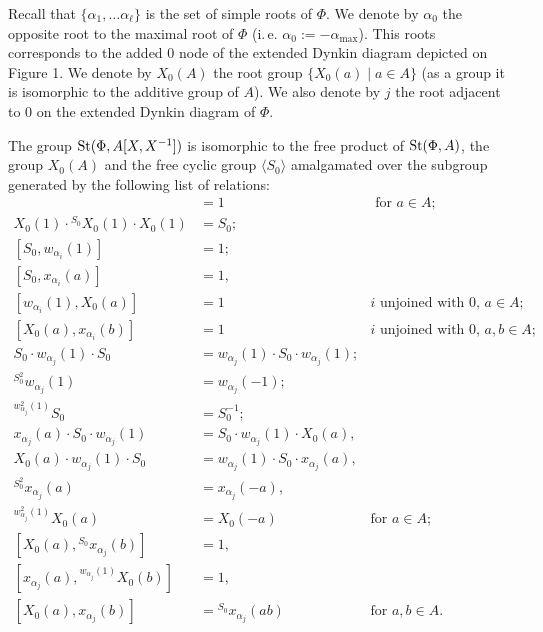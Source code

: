 Recall that $\{ \alpha_1, \ldots \alpha_\ell \}$ is the set of simple roots of $\Phi$.
We denote by $\alpha_0$ the opposite root to the maximal root of $\Phi$ (i.\,e. $\alpha_0 := -\alpha_\mathrm{max}$).
This roots corresponds to the added $0$ node of the extended Dynkin diagram depicted on Figure 1.
We denote by $X_0(A)$ the root group $\{ X_0(a) \mid a \in A\}$ (as a group it is isomorphic to the additive group of $A$).
We also denote by $j$ the root adjacent to $0$ on the extended Dynkin diagram of $\Phi$.
\begin{prop} \label{prop:Allcock-affine} The group $\operatorname{St}(\Phi, A[X, X^{-1}])$ is isomorphic to the free product of $\operatorname{St}(\Phi, A)$, the group $X_0(A)$ and the free cyclic group $\langle S_0 \rangle$
     amalgamated over the subgroup generated by the following list of relations:
    {\allowdisplaybreaks\begin{align}
        [S_0^2, X_0(a)] & = 1 & \text{ for $a \in A$; } \label{eq:Allcock-2} \\
        X_0(1) \cdot {}^{S_0} X_0(1) \cdot X_0(1) & = S_0; \label{eq:Allcock-3} \\
        [S_0, w_{\alpha_i}(1)] & = 1; &  \label{eq:Allcock-4} \\
        [S_0, x_{\alpha_i}(a)] & = 1, &  \label{eq:Allcock-5-1}\\
        [w_{\alpha_i}(1), X_0(a)] & = 1 & \text{$i$ unjoined with $0$, $a \in A;$} \label{eq:Allcock-5-2} \\
        [X_0(a), x_{\alpha_i}(b)] & = 1 & \text{$i$ unjoined with $0$, $a, b \in A;$} \label{eq:Allcock-6} \\
        S_0 \cdot w_{\alpha_j}(1) \cdot S_0 & = w_{\alpha_j}(1) \cdot S_0 \cdot w_{\alpha_j}(1); \label{eq:Allcock-7} \\
        {}^{S_0^2} w_{\alpha_j}(1) & = w_{\alpha_j}(-1); \label{eq:Allcock-8-1} \\
        {}^{w_{\alpha_j}^2(1)} S_0 & = S_0^{-1}; \label{eq:Allcock-8-2} \\
        x_{\alpha_j}(a) \cdot S_0 \cdot w_{\alpha_j}(1) & = S_0 \cdot w_{\alpha_j}(1) \cdot X_0(a), & \label{eq:Allcock-9-1} \\
        X_0(a) \cdot w_{\alpha_j}(1) \cdot S_0 & = w_{\alpha_j}(1) \cdot S_0 \cdot x_{\alpha_j}(a), & \label{eq:Allcock-9-2} \\
        {}^{S_0^2} x_{\alpha_j}(a) & = x_{\alpha_j}(-a), & \label{eq:Allcock-10-1} \\
        {}^{w_{\alpha_j}^2(1)} X_0(a) & = X_0(-a) & \text{for $a \in A;$} \label{eq:Allcock-10-2} \\
        [X_0(a), {}^{S_0} x_{\alpha_j}(b)] &= 1, & \label{eq:Allcock-11-1} \\
        [x_{\alpha_j}(a), {}^{w_{\alpha_j}(1)}X_0(b)] &= 1, & \label{eq:Allcock-11-2} \\
        [X_0(a), x_{\alpha_j}(b)] &= {}^{S_0} x_{\alpha_j}(ab) & \text{for $a, b \in A.$} \label{eq:Allcock-12}
    \end{align}}
\end{prop}
